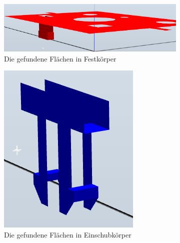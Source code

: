 \documentclass[14pt,a4paper,titlepage]{article}
\begin{document}
		\begin{figure}[t!]
			\centering
			\begin{subfigure}{0.3\linewidth}
				\includegraphics[width=\linewidth]{basefaces3.png}
				\caption{Die gefundene Flächen in Festkörper}
			\end{subfigure}
			\begin{subfigure}{0.3\linewidth}
				\includegraphics[width=\linewidth]{insertfaces3.png}
				\caption{Die gefundene Flächen in Einschubkörper}
			\end{subfigure}	
			\begin{subfigure}{0.3\linewidth}

\end{subfigure}
\end{figure}
\end{document}
